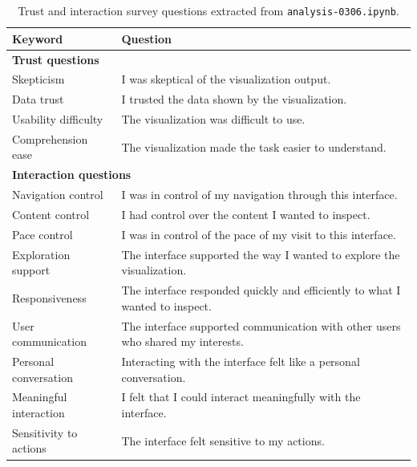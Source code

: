 \begin{table}[t]
\centering
\caption{Trust and interaction survey questions extracted from \texttt{analysis-0306.ipynb}.}
\label{tab:trust-interaction-questions}
\begin{tabular}{p{} p{}}
\hline
\textbf{Keyword} & \textbf{Question} \\
\hline
\multicolumn{2}{l}{\textbf{Trust questions}} \\
\hline
Skepticism & I was skeptical of the visualization output. \\
Data trust & I trusted the data shown by the visualization. \\
Usability difficulty & The visualization was difficult to use. \\
Comprehension ease & The visualization made the task easier to understand. \\
\hline
\multicolumn{2}{l}{\textbf{Interaction questions}} \\
\hline
Navigation control & I was in control of my navigation through this interface. \\
Content control & I had control over the content I wanted to inspect. \\
Pace control & I was in control of the pace of my visit to this interface. \\
Exploration support & The interface supported the way I wanted to explore the visualization. \\
Responsiveness & The interface responded quickly and efficiently to what I wanted to inspect. \\
User communication & The interface supported communication with other users who shared my interests. \\
Personal conversation & Interacting with the interface felt like a personal conversation. \\
Meaningful interaction & I felt that I could interact meaningfully with the interface. \\
Sensitivity to actions & The interface felt sensitive to my actions. \\
\hline
\end{tabular}
\end{table}
